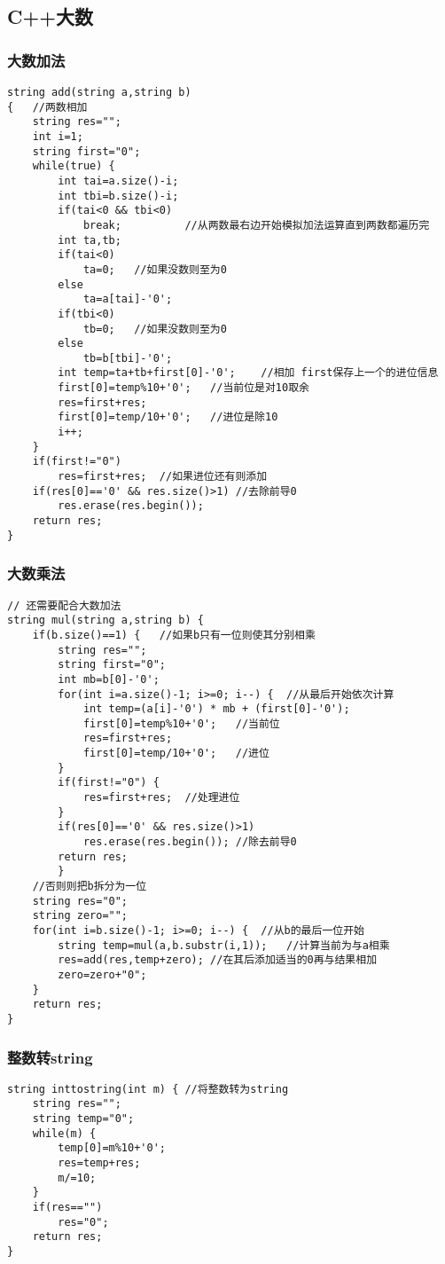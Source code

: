 \subsection{C++大数}
\subsubsection{大数加法}
\begin{lstlisting}
string add(string a,string b)
{	//两数相加
	string res="";
	int i=1;
	string first="0";
	while(true) {
		int tai=a.size()-i;
		int tbi=b.size()-i;
		if(tai<0 && tbi<0)
			break;			//从两数最右边开始模拟加法运算直到两数都遍历完
		int ta,tb;
		if(tai<0)
			ta=0;	//如果没数则至为0
		else
			ta=a[tai]-'0';
		if(tbi<0)
			tb=0;	//如果没数则至为0
		else
			tb=b[tbi]-'0';
		int temp=ta+tb+first[0]-'0';	//相加 first保存上一个的进位信息
		first[0]=temp%10+'0';	//当前位是对10取余
		res=first+res;
		first[0]=temp/10+'0';	//进位是除10
		i++;
	}
	if(first!="0")
		res=first+res;	//如果进位还有则添加
	if(res[0]=='0' && res.size()>1)	//去除前导0
		res.erase(res.begin());
	return res;
}
\end{lstlisting}

\subsubsection{大数乘法}
\begin{lstlisting}
// 还需要配合大数加法
string mul(string a,string b) {
	if(b.size()==1) {	//如果b只有一位则使其分别相乘
		string res="";
		string first="0";
		int mb=b[0]-'0';
		for(int i=a.size()-1; i>=0; i--) {	//从最后开始依次计算
			int temp=(a[i]-'0') * mb + (first[0]-'0');
			first[0]=temp%10+'0';	//当前位
			res=first+res;
			first[0]=temp/10+'0';	//进位
		}
		if(first!="0") {
			res=first+res;	//处理进位
		}
		if(res[0]=='0' && res.size()>1)
			res.erase(res.begin());	//除去前导0
		return res;
		}
	//否则则把b拆分为一位
	string res="0";
	string zero="";
	for(int i=b.size()-1; i>=0; i--) {	//从b的最后一位开始
		string temp=mul(a,b.substr(i,1));	//计算当前为与a相乘
		res=add(res,temp+zero);	//在其后添加适当的0再与结果相加
		zero=zero+"0";
	}
	return res;
}
\end{lstlisting}

\subsubsection{整数转string}
\begin{lstlisting}
string inttostring(int m) {	//将整数转为string
	string res="";
	string temp="0";
	while(m) {
		temp[0]=m%10+'0';
		res=temp+res;
		m/=10;
	}
	if(res=="")
		res="0";
	return res;
}
\end{lstlisting}


